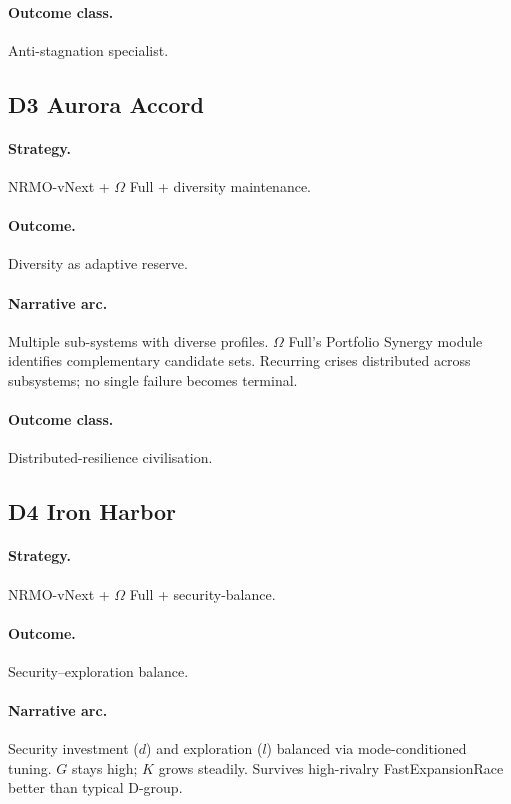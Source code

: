 \paragraph{Outcome class.} Anti-stagnation specialist.

\subsection{D3 Aurora Accord}
\label{civ:d3}

\paragraph{Strategy.} NRMO-vNext + $\Omega$ Full + diversity
maintenance.
\paragraph{Outcome.} Diversity as adaptive reserve.
\paragraph{Narrative arc.}
Multiple sub-systems with diverse profiles. $\Omega$ Full's
Portfolio Synergy module identifies complementary candidate sets.
Recurring crises distributed across subsystems; no single failure
becomes terminal.
\paragraph{Outcome class.} Distributed-resilience civilisation.

\subsection{D4 Iron Harbor}
\label{civ:d4}

\paragraph{Strategy.} NRMO-vNext + $\Omega$ Full +
security-balance.
\paragraph{Outcome.} Security--exploration balance.
\paragraph{Narrative arc.}
Security investment ($d$) and exploration ($l$) balanced via
mode-conditioned tuning. $G$ stays high; $K$ grows steadily.
Survives high-rivalry FastExpansionRace better than typical D-group.
